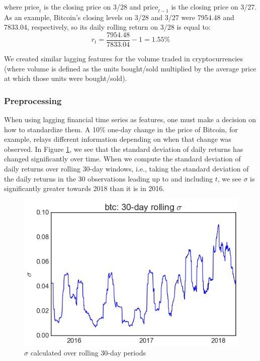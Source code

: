\documentclass[12pt,twoside]{article}
\begin{document}
where $\text{price}_t$ is the closing price on 3/28 and $\text{price}_{t-1}$ is the closing price on 3/27. As an example, Bitcoin's closing levels on 3/28 and 3/27 were 7954.48 and 7833.04, respectively, so its daily rolling return on 3/28 is equal to:
$$r_t = \frac{7954.48}{7833.04} - 1=1.55\%$$

We created similar lagging features for the volume traded in cryptocurrencies (where volume is defined as the units bought/sold multiplied by the average price at which those units were bought/sold).

\subsubsection{Preprocessing}

When using lagging financial time series as features, one must make a decision on how to standardize them. A 10\% one-day change in the price of Bitcoin, for example, relays different information depending on when that change was observed. In Figure \ref{fig:ma_returns_std_btc}, we see that the standard deviation of daily returns has changed significantly over time. When we compute the standard deviation of daily returns over rolling 30-day windows, i.e., taking the standard deviation of the daily returns in the 30 observations leading up to and including $t$, we see $\sigma$ is significantly greater towards 2018 than it is in 2016.

\begin{figure}[H]
	\begin{center}
		\includegraphics[scale=0.75]{ma_returns_std_btc}
		\caption{$\sigma$ calculated over rolling 30-day periods}
		\label{fig:ma_returns_std_btc}
	\end{center}
\end{figure}
\end{document}
